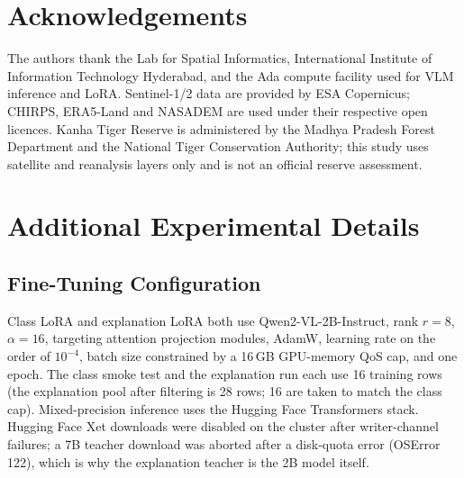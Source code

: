 \documentclass[11pt]{article}
\begin{document}

\section*{Acknowledgements}

The authors thank the Lab for Spatial Informatics, International
Institute of Information Technology Hyderabad, and the Ada compute
facility used for VLM inference and LoRA. Sentinel-1/2 data are
provided by ESA Copernicus; CHIRPS, ERA5-Land and NASADEM are
used under their respective open licences. Kanha Tiger Reserve is
administered by the Madhya Pradesh Forest Department and the
National Tiger Conservation Authority; this study uses satellite
and reanalysis layers only and is not an official reserve
assessment.





\clearpage
\appendix

\section{Additional Experimental Details}

\subsection{Fine-Tuning Configuration}

Class LoRA and explanation LoRA both use Qwen2-VL-2B-Instruct,
rank $r=8$, $\alpha=16$, targeting attention projection modules,
AdamW, learning rate on the order of $10^{-4}$, batch size constrained
by a 16\,GB GPU-memory QoS cap, and one epoch. The class smoke test
and the explanation run each use 16 training rows (the explanation
pool after filtering is 28 rows; 16 are taken to match the class
cap). Mixed-precision inference uses the Hugging Face Transformers
stack. Hugging Face Xet downloads were disabled on the cluster after
writer-channel failures; a 7B teacher download was aborted after a
disk-quota error (OSError 122), which is why the explanation teacher
is the 2B model itself.
\end{document}
